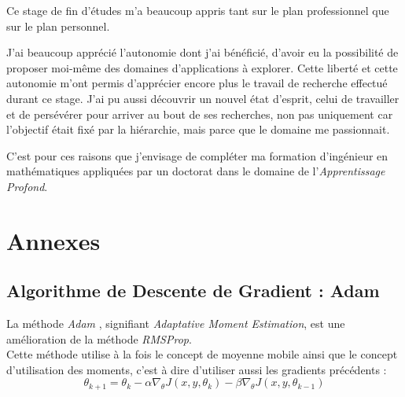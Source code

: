 \documentclass[a4paper, 11pt]{report}
\begin{document}
Ce stage de fin d'études m'a beaucoup appris tant sur le plan professionnel que sur le plan personnel.

J'ai beaucoup apprécié l'autonomie dont j'ai bénéficié, d'avoir eu la possibilité de proposer moi-même des domaines d'applications à explorer.
Cette liberté et cette autonomie m'ont permis d'apprécier encore plus le travail de recherche effectué durant ce stage.
J'ai pu aussi découvrir un nouvel état d'esprit, celui de travailler et de persévérer pour arriver au bout de ses recherches, non pas uniquement car l'objectif était fixé par la hiérarchie, mais parce que le domaine me passionnait.

C'est pour ces raisons que j'envisage de compléter ma formation d'ingénieur en mathématiques appliquées par un doctorat dans le domaine de l'\emph{Apprentissage Profond}.



\chapter*{Annexes}
\section{Algorithme de Descente de Gradient : Adam}
La méthode \emph{Adam} \citep{Kingma2014}, signifiant \emph{Adaptative Moment Estimation}, est une amélioration de la méthode \emph{RMSProp}.\\
Cette méthode utilise à la fois le concept de moyenne mobile ainsi que le concept d'utilisation des moments, c'est à dire d'utiliser aussi les gradients précédents :
$$\theta_{k+1} = \theta_k - \alpha \nabla_\theta J(x,y,\theta_k) - \beta \nabla_\theta J(x,y,\theta_{k-1})$$
\end{document}

